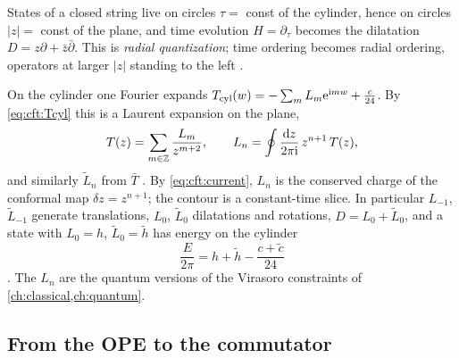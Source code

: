States of a closed string live on circles $\tau=$ const of the cylinder, hence on circles
$|z|=$ const of the plane, and time evolution $H=\partial_\tau$ becomes the dilatation
$D=z\partial+\bar z\bar\partial$. This is \emph{radial quantization};
time ordering becomes radial ordering, operators at larger $|z|$ standing to the left
.

On the cylinder one Fourier expands $T_{\rm cyl}(w)=-\sum_mL_m\mathrm{e}^{\mathrm{i} mw}+\frac c{24}$. By
\eqref{eq:cft:Tcyl} this is a Laurent expansion on the plane,
\begin{equation}\label{eq:cft:Ln}
  T(z)=\sum_{m\in\mathbb{Z}}\frac{L_m}{z^{m+2}},\qquad
  L_n=\oint\frac{\mathrm{d} z}{2\pi\mathrm{i}}\,z^{n+1}\,T(z),
\end{equation}
and similarly $\tilde L_n$ from $\bar T$ . By
\eqref{eq:cft:current}, $L_n$ is the conserved charge of the conformal map $\delta z=z^{n+1}$; the
contour is a constant-time slice. In particular $L_{-1}$, $\tilde L_{-1}$ generate translations,
$L_0$, $\tilde L_0$ dilatations and rotations, $D=L_0+\tilde L_0$, and a state with $L_0=h$,
$\tilde L_0=\tilde h$ has energy on the cylinder
\begin{equation}\label{eq:cft:D}
  \frac{E}{2\pi}=h+\tilde h-\frac{c+\tilde c}{24}
\end{equation}
. The $L_n$ are the quantum versions
of the Virasoro constraints of \cref{ch:classical,ch:quantum}.

\subsection{From the OPE to the commutator}

